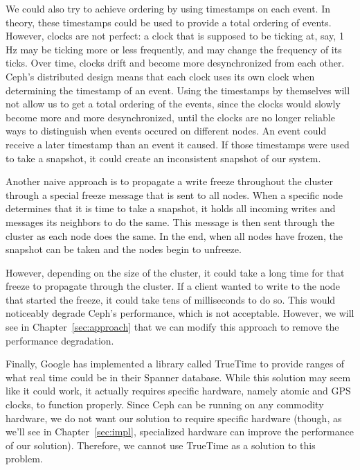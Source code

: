 We could also try to achieve ordering by using timestamps on each event. In theory,
these timestamps could be used to provide a total ordering of events. However,
clocks are not perfect: a clock that is supposed to be ticking at, say, 1 Hz 
may be ticking more or less frequently, and may change the frequency of its 
ticks. Over time, clocks drift and become more
desynchronized from each other. Ceph's distributed design means that
each clock uses its own clock when determining the timestamp of an
event. Using the timestamps by themselves will not allow us to get a
total ordering of the events, since the clocks would slowly become
more and more desynchronized, until the clocks are no longer reliable
ways to distinguish when events occured on different nodes. An event
could receive a later timestamp than an event it caused. If those timestamps 
were used to take a snapshot, it could create an inconsistent snapshot of our 
system.

Another naive approach is to propagate a write freeze throughout the
cluster through a special freeze message that is sent to all nodes.  When a specific node determines that it is time to take a
snapshot, it holds all incoming writes and messages its neighbors to
do the same. This message is then sent through the cluster as each node
does the same. In the end, when all nodes have frozen, the snapshot
can be taken and the nodes begin to unfreeze.

However, depending on the size of the cluster, it could take a long
time for that freeze to propagate through the cluster. If a client
wanted to write to the node that started the freeze, it could take
tens of milliseconds to do so.  This would noticeably degrade Ceph's
performance, which is not acceptable.  However, we will see in
Chapter~\ref{sec:approach} that we can modify this approach to remove
the performance degradation.

Finally, Google has implemented a library called TrueTime to provide
ranges of what real time could be in their Spanner database. While
this solution may seem like it could work, it actually requires
specific hardware, namely atomic and GPS clocks, to function
properly. Since Ceph can be running on any commodity hardware, we do
not want our solution to require specific hardware (though, as we'll
see in Chapter~\ref{sec:impl}, specialized hardware can improve the
performance of our solution). Therefore, we cannot use TrueTime as a
solution to this problem. 














